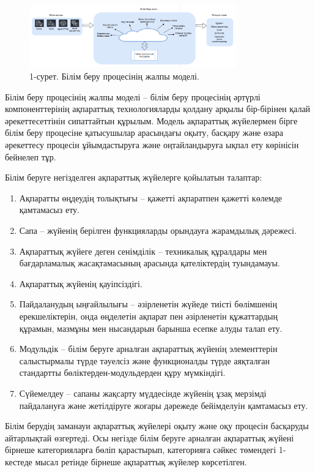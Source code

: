 \begin{figure}[H]
	\centering
	\includegraphics[width=0.8\textwidth]{media/ict/image99}
	\caption*{1-сурет. Білім беру процесінің жалпы моделі.}
\end{figure}

\begin{multicols}{2}
Білім беру процесінің жалпы моделі -- білім беру процесінің әртүрлі
компоненттерінің ақпараттық технологияларды қолдану арқылы бір-бірінен
қалай әрекеттесеттінін сипаттайтын құрылым. Модель ақпараттық жүйелермен
бірге білім беру процесіне қатысушылар арасындағы оқыту, басқару және
өзара әрекеттесу процесін ұйымдастыруға және оңтайландыруға ықпал ету
көрінісін бейнелеп тұр.

Білім беруге негізделген ақпараттық жүйелерге қойылатын талаптар:

\begin{enumerate}
\def\labelenumi{\arabic{enumi}.}
\item
  Ақпаратты өңдеудің толықтығы -- қажетті ақпаратпен қажетті көлемде
  қамтамасыз ету.
\item
  Сапа -- жүйенің берілген функцияларды орындауға жарамдылық дәрежесі.
\item
  Ақпараттық жүйеге деген сенімділік -- техникалық құралдары мен
  бағдарламалық жасақтамасының арасында қателіктердің туындамауы.
\item
  Ақпараттық жүйенің қауіпсіздігі.
\item
  Пайдаланудың ыңғайлылығы -- әзірленетін жүйеде тиісті бөлімшенің
  ерекшеліктерін, онда өңделетін ақпарат пен әзірленетін құжаттардың
  құрамын, мазмұны мен нысандарын барынша есепке алуды талап ету.
\item
  Модульдік -- білім беруге арналған ақпараттық жүйенің элементтерін
  салыстырмалы түрде тәуелсіз және функционалды түрде аяқталған
  стандартты бөліктерден-модульдерден құру мүмкіндігі.
\item
  Сүйемелдеу -- сапаны жақсарту мүддесінде жүйенің ұзақ мерзімді
  пайдалануға және жетілдіруге жоғары дәрежеде бейімделуін қамтамасыз
  ету.
\end{enumerate}

Білім берудің заманауи ақпараттық жүйелері оқыту және оқу процесін
басқаруды айтарлықтай өзгертеді. Осы негізде білім беруге арналған
ақпараттық жүйені бірнеше категорияларға бөліп қарастырып, категорияға
сәйкес төмендегі 1-кестеде мысал ретінде бірнеше ақпараттық жүйелер
көрсетілген.
\end{multicols}

